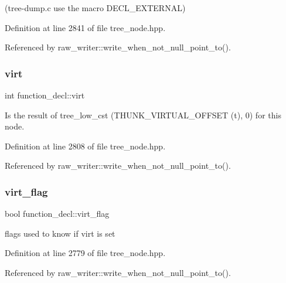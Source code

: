 (tree-\/dump.\+c use the macro D\+E\+C\+L\+\_\+\+E\+X\+T\+E\+R\+N\+AL) 

Definition at line 2841 of file tree\+\_\+node.\+hpp.



Referenced by raw\+\_\+writer\+::write\+\_\+when\+\_\+not\+\_\+null\+\_\+point\+\_\+to().

\mbox{\label{structfunction__decl_a4049457c006c5c4652f98868a5939738}} 
\subsubsection{\texorpdfstring{virt}{virt}}
{\footnotesize\ttfamily int function\+\_\+decl\+::virt}



Is the result of tree\+\_\+low\+\_\+cst (T\+H\+U\+N\+K\+\_\+\+V\+I\+R\+T\+U\+A\+L\+\_\+\+O\+F\+F\+S\+ET (t), 0) for this node. 



Definition at line 2808 of file tree\+\_\+node.\+hpp.



Referenced by raw\+\_\+writer\+::write\+\_\+when\+\_\+not\+\_\+null\+\_\+point\+\_\+to().

\mbox{\label{structfunction__decl_a9edfefe691893d0542c68e7d35212286}} 
\subsubsection{\texorpdfstring{virt\+\_\+flag}{virt\_flag}}
{\footnotesize\ttfamily bool function\+\_\+decl\+::virt\+\_\+flag}



flags used to know if virt is set 



Definition at line 2779 of file tree\+\_\+node.\+hpp.



Referenced by raw\+\_\+writer\+::write\+\_\+when\+\_\+not\+\_\+null\+\_\+point\+\_\+to().

\mbox{\label{structfunction__decl_a25ca1390c712916c74c4ec4eaf8a4043}} 
